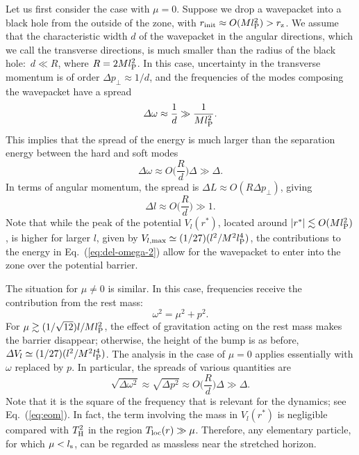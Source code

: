 \documentclass[12pt]{article}
\begin{document}
Let us first consider the case with $\mu = 0$.  Suppose we drop 
a wavepacket into a black hole from the outside of the zone, with 
$r_{\rm init} \approx O(M l_{\rm P}^2) > r_{\rm z}$.  We assume 
that the characteristic width $d$ of the wavepacket in the angular 
directions, which we call the transverse directions, is much 
smaller than the radius of the black hole:\ $d \ll R$, where 
$R = 2 M l_{\rm P}^2$.  In this case, uncertainty in the transverse 
momentum is of order $\varDelta p_\perp \approx 1/d$, and the 
frequencies of the modes composing the wavepacket have a spread
%
\begin{equation}
  \varDelta \omega \approx \frac{1}{d} \gg \frac{1}{M l_{\rm P}^2}.
\label{eq:del-omega}
\end{equation}
%
This implies that the spread of the energy is much larger than the 
separation energy between the hard and soft modes
%
\begin{equation}
  \varDelta \omega \approx O\biggl(\frac{R}{d}\biggr) \Delta 
  \gg \Delta.
\label{eq:del-omega-2}
\end{equation}
%
In terms of angular momentum, the spread is $\varDelta L \approx 
O(R \varDelta p_\perp)$, giving
%
\begin{equation}
  \varDelta l \approx O\biggl(\frac{R}{d}\biggr) \gg 1.
\label{eq:del-l}
\end{equation}
%
Note that while the peak of the potential $V_l(r^*)$, located around 
$|r^*| \lesssim O(M l_{\rm P}^2)$, is higher for larger $l$, given 
by $V_{l,{\rm max}} \simeq (1/27) (l^2/M^2 l_{\rm P}^4)$, the 
contributions to the energy in Eq.~(\ref{eq:del-omega-2}) allow 
for the wavepacket to enter into the zone over the potential 
barrier.

The situation for $\mu \neq 0$ is similar.  In this case, 
frequencies receive the contribution from the rest mass:
%
\begin{equation}
  \omega^2 = \mu^2 + p^2.
\label{eq:omega-mass}
\end{equation}
%
For $\mu \gtrsim (1/\sqrt{12})l/M l_{\rm P}^2$, the effect of 
gravitation acting on the rest mass makes the barrier disappear; 
otherwise, the height of the bump is as before, $\varDelta V_l 
\simeq (1/27) (l^2/M^2 l_{\rm P}^4)$.  The analysis in the case 
of $\mu = 0$ applies essentially with $\omega$ replaced by $p$. 
In particular, the spreads of various quantities are
%
\begin{equation}
  \sqrt{\varDelta \omega^2} \approx \sqrt{\varDelta p^2} 
  \approx O\biggl(\frac{R}{d}\biggr) \Delta \gg \Delta.
\label{eq:spreads}
\end{equation}
%
Note that it is the square of the frequency that is relevant for the 
dynamics; see Eq.~(\ref{eq:eom}).  In fact, the term involving the 
mass in $V_l(r^*)$ is negligible compared with $T_{\rm H}^2$ in the 
region $T_{\rm loc}(r) \gg \mu$.  Therefore, any elementary particle, 
for which $\mu < l_{\rm s}$, can be regarded as massless near the 
stretched horizon.
\end{document}
